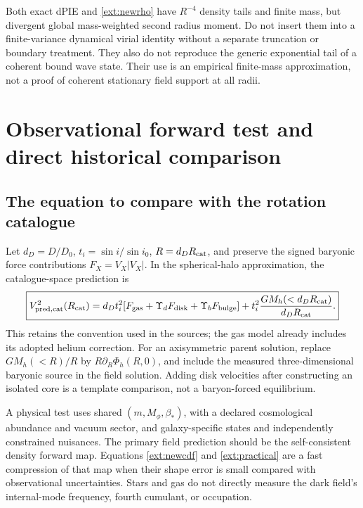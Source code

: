 \documentclass[11pt]{article}
\newcommand{\mf}{M_\phi}
\begin{document}
Both exact dPIE and \eqref{ext:newrho} have $R^{-4}$ density tails and finite mass, but divergent global mass-weighted second radius moment. Do not insert them into a finite-variance dynamical virial identity without a separate truncation or boundary treatment. They also do not reproduce the generic exponential tail of a coherent bound wave state. Their use is an empirical finite-mass approximation, not a proof of coherent stationary field support at all radii.

\section{Observational forward test and direct historical comparison}
\subsection{The equation to compare with the rotation catalogue}
Let $d_D=D/D_0$, $t_i=\sin i/\sin i_0$, $R=d_D R_{\rm cat}$, and preserve the signed baryonic force contributions $F_X=V_X|V_X|$. In the spherical-halo approximation, the catalogue-space prediction is
\begin{equation}
 \boxed{V_{{\rm pred,cat}}^2(R_{\rm cat})=
 d_Dt_i^2[F_{\rm gas}+\Upsilon_dF_{\rm disk}+\Upsilon_bF_{\rm bulge}]
       +t_i^2\frac{GM_h(<d_D R_{\rm cat})}{d_D R_{\rm cat}}.}
 \label{ext:catalogue}
\end{equation}
This retains the convention used in the sources; the gas model already includes its adopted helium correction. For an axisymmetric parent solution, replace $GM_h(<R)/R$ by $R\partial_R\Phi_h(R,0)$, and include the measured three-dimensional baryonic source in the field solution. Adding disk velocities after constructing an isolated core is a template comparison, not a baryon-forced equilibrium.

A physical test uses shared $(m,\mf,\beta_*)$, with a declared cosmological abundance and vacuum sector, and galaxy-specific states and independently constrained nuisances. The primary field prediction should be the self-consistent density forward map. Equations \eqref{ext:newcdf} and \eqref{ext:practical} are a fast compression of that map when their shape error is small compared with observational uncertainties. Stars and gas do not directly measure the dark field's internal-mode frequency, fourth cumulant, or occupation.
\end{document}
